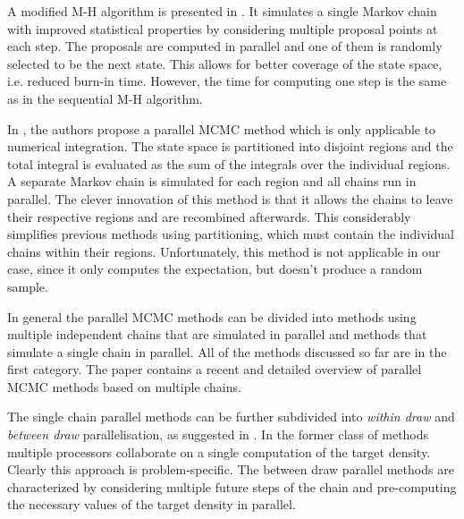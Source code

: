 \documentclass[11pt]{article}       %
\begin{document}
A modified M-H algorithm is presented in \cite{miller2010markov}.  It simulates
a single Markov chain with improved  statistical properties by considering
multiple proposal points at each step.  The proposals are computed in  parallel
and one of them is randomly selected to be the next state.  This allows for
better coverage of the state space, i.e. reduced burn-in time.  However, the
time for computing one step is the same as in the sequential 
M-H algorithm.


In \cite{vanderwerken2013parallel}, the authors propose a parallel MCMC method
which is only applicable to numerical integration.  The state space is
partitioned into disjoint regions and the total integral is evaluated as the
sum of the integrals over the individual regions. A separate Markov chain is
simulated for each region and all chains run in parallel.  The clever
innovation of this method is that it allows the chains to leave their
respective regions and are recombined afterwards.  This considerably simplifies
previous methods using partitioning, which must contain the individual chains
within their regions.  Unfortunately, this method is not applicable in our
case, since it only computes the expectation, but doesn't produce a random
sample.

In general the parallel MCMC methods can be divided into methods using multiple
independent chains that are simulated in parallel and methods that simulate a
single chain in parallel.  All of the methods discussed so far are in the first
category.  The paper \cite{guo2012parallel} contains a recent and detailed
overview of parallel MCMC methods based on multiple chains.

The single chain parallel methods can be further subdivided into \emph{within
draw} and \emph{between draw} parallelisation, as suggested in
\cite{strid2010efficient}.  In the former class of methods multiple processors
collaborate on a single computation of the target density.  Clearly this
approach is problem-specific.  The between draw parallel methods are
characterized by considering multiple future steps of the chain and
pre-computing the necessary values of the target density in parallel. 
\end{document}

